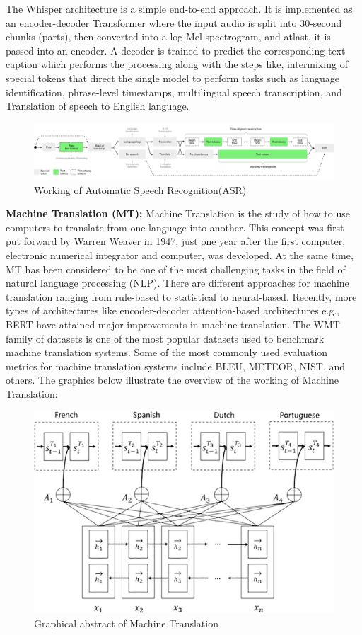 \documentclass[12px, a4paper]{article}
\begin{document}
The Whisper architecture is a simple end-to-end approach. It is implemented as an encoder-decoder Transformer where the input audio is split into 30-second chunks (parts), then converted into a log-Mel spectrogram, and atlast, it is passed into an encoder. A decoder is trained to predict the corresponding text caption which performs the processing along with the steps like, intermixing of special tokens that direct the single model to perform tasks such as language identification, phrase-level timestamps, multilingual speech transcription, and Translation of speech to English language.

\begin{figure}[!htb]
    \includegraphics[width=\textwidth]{asr-details.png}
    \caption{Working of Automatic Speech Recognition(ASR)}
\end{figure}

\textbf{Machine Translation (MT):}
Machine Translation is the study of how to use computers to translate from one language into another. This concept was first put forward by Warren Weaver in 1947, just one year after the first computer, electronic numerical integrator and computer, was developed. At the same time, MT has been considered to be one of the most challenging tasks in the field of natural language processing (NLP). There are different approaches for machine translation ranging from rule-based to statistical to neural-based. Recently, more types of architectures like encoder-decoder attention-based architectures e.g., BERT have attained major improvements in machine translation. The WMT family of datasets is one of the most popular datasets used to benchmark machine translation systems. Some of the most commonly used evaluation metrics for machine translation systems include BLEU, METEOR, NIST, and others. The graphics below illustrate the overview of the working of Machine Translation: 

\begin{figure}[!htb]
    \centering
    \includegraphics[width=\textwidth]{MT.jpg}
    \caption{Graphical abstract of Machine Translation}
\end{figure}
\end{document}
